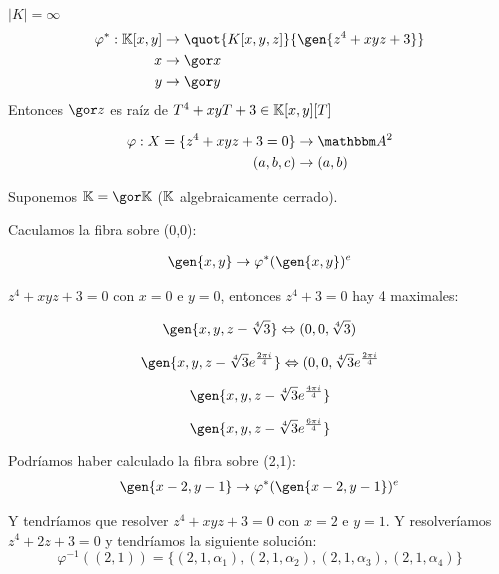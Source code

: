\begin{example}

	$|K| = \infty$
	\begin{align*}
		\varphi^*: \K[x,y]& \rightarrow \quot{K[x,y,z]}{\gen{z^4+xyz+3}} \\
		x & \rightarrow \cls{x} \\
		y & \rightarrow \cls{y} \\
	\end{align*}
	Entonces $\cls{z}$ es raíz de $T^4+xyT+3 \in \mathbb{K}[x,y][T]$

	\begin{align*}
		\varphi: X=\{ z^4+xyz+3=0  \} & \rightarrow \A^2 \\
		(a,b,c) & \rightarrow (a,b)
	\end{align*}

	Suponemos $\K= \cls{\K}$ ($\mathbb{K}$ algebraicamente cerrado).

	Caculamos la fibra sobre (0,0):

	\begin{align*}
		\gen{x,y} & \rightarrow \varphi^*(\gen{x,y})^e \\
	\end{align*}

	$z^4+xyz+3=0$ con $x=0$ e $y=0$, entonces $z^4+3=0$ hay 4 maximales:

	$$\gen{x,y,z- \sqrt[4]{3}} \Leftrightarrow (0,0,\sqrt[4]{3})$$

	$$\gen{x,y,z- \sqrt[4]{3}e^{\frac{2 \pi i}{4}}} \Leftrightarrow (0,0,\sqrt[4]{3}e^{\frac{2 \pi i}{4}}$$

	$$\gen{x,y,z- \sqrt[4]{3}e^{\frac{4 \pi i}{4}}}$$

	$$\gen{x,y,z- \sqrt[4]{3}e^{\frac{6 \pi i}{4}}}$$


	Podríamos haber calculado la fibra sobre (2,1):
	\begin{align*}
		\gen{x-2,y-1} & \rightarrow \varphi^*(\gen{x-2,y-1})^e \\
	\end{align*}

	Y tendríamos que resolver $z^4+xyz+3=0$ con $x=2$ e $y=1$. Y resolveríamos $z^4+2z+3=0$ y tendríamos la siguiente solución:
	$$\varphi^{-1}((2,1))=\{ (2,1,\alpha_1), (2,1,\alpha_2),(2,1,\alpha_3), (2,1,\alpha_4) \}$$
\end{example}

